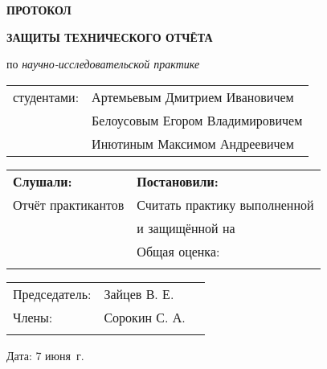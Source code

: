\begin{center}
\bfseries{\large ПРОТОКОЛ }

\vspace{12pt}

\bfseries{ЗАЩИТЫ ТЕХНИЧЕСКОГО ОТЧЁТА}
\end{center}
\noindent
по {\itshape научно-исследовательской практике}

\vspace{8pt}
\noindent\begin{tabular}{@{}l l}
студентами: & Артемьевым Дмитрием Ивановичем \\
& Белоусовым Егором Владимировичем \\
& Инютиным Максимом Андреевичем \\
\end{tabular}

\begin{longtable}{p{7cm}|p{11cm}}
    \hline
    {\bfseries Слушали:} & {\bfseries Постановили:}  \\
    Отчёт практикантов & Считать практику выполненной \\
    & и защищённой на \\
    \rule{0pt}{400pt} & Общая оценка: \underline{\hspace{2in}}\\
    \rule{0pt}{15pt} & \\
    \hline
\end{longtable}

\vfill

\noindent\begin{tabular}{@{}l l l}
Председатель: & Зайцев В. Е. & \underline{\hspace{2in}} \\
Члены: & Сорокин С. А. & \underline{\hspace{2in}} \\
& & \underline{\hspace{2in}}
\end{tabular}
\vspace{12pt}

\noindent
Дата: 7 июня \the\year\,г.

\pagebreak
